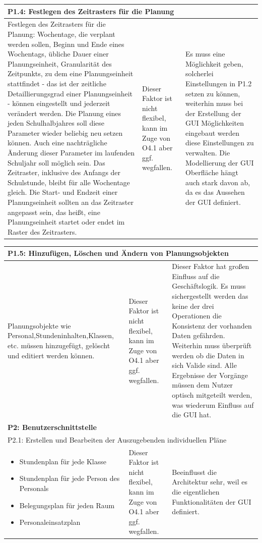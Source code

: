 \documentclass[fontsize=12pt,paper=a4,twoside]{scrartcl}
\begin{document}
\begin{tabularx}{\textwidth}{|X|X|X|}
\hline
\multicolumn{3}{|l|}{P1.4: Festlegen des Zeitrasters für die Planung}\\\hline
Festlegen des Zeitrasters für die Planung: Wochentage, die verplant werden sollen, Beginn und Ende eines Wochentags, übliche Dauer einer Planungseinheit, Granularität des Zeitpunkts, zu dem eine Planungseinheit stattfindet - das ist der zeitliche Detaillierungsgrad einer Planungseinheit - können eingestellt und jederzeit verändert werden. Die Planung eines jeden Schulhalbjahres soll diese Parameter wieder beliebig neu setzen können. Auch eine nachträgliche Änderung dieser Parameter im laufenden Schuljahr soll möglich sein. Das Zeitraster, inklusive des Anfangs der Schulstunde, bleibt für alle Wochentage gleich. Die Start- und Endzeit einer Planungseinheit sollten an das Zeitraster angepasst sein, das heißt, eine Planungseinheit startet oder endet im Raster des Zeitrasters. & Dieser Faktor ist nicht flexibel, kann im Zuge von O4.1 aber ggf. wegfallen. & Es muss eine Möglichkeit geben, solcherlei Einstellungen in P1.2 setzen zu können, weiterhin muss bei der Erstellung der GUI Möglichkeiten eingebaut werden diese Einstellungen zu verwalten. Die Modellierung der GUI Oberfläche hängt auch stark davon ab, da es das Aussehen der GUI definiert. \\\hline
\end{tabularx} \newpage

\begin{tabularx}{\textwidth}{|X|X|X|}
\hline
\multicolumn{3}{|l|}{P1.5: Hinzufügen, Löschen und Ändern von Planungsobjekten}\\\hline
Planungsobjekte wie Personal,Stundeninhalten,Klassen, etc. müssen hinzugefügt, gelöscht und editiert werden können.& Dieser Faktor ist nicht flexibel, kann im Zuge von O4.1 aber ggf. wegfallen. & Dieser Faktor hat großen Einfluss auf die Geschäftslogik. Es muss sichergestellt werden das keine der drei Operationen die Konsistenz der vorhanden Daten gefährden. Weiterhin muss überprüft werden ob die Daten in sich Valide sind. Alle Ergebnisse der Vorgänge müssen dem Nutzer optisch mitgeteilt werden, was wiederum Einfluss auf die GUI hat. \\\hline
\multicolumn{3}{|l|}{\textbf{P2: Benutzerschnittstelle}}\\\hline
\multicolumn{3}{|l|}{P2.1: Erstellen und Bearbeiten der Auszugebenden individuellen Pläne}\\\hline
\begin{itemize}
\item Stundenplan für jede Klasse
\item Stundenplan für jede Person des Personals
\item Belegungsplan für jeden Raum
\item Personaleinsatzplan 
\end{itemize} & Dieser Faktor ist nicht flexibel, kann im Zuge von O4.1 aber ggf. wegfallen. & Beeinflusst die Architektur sehr, weil es die eigentlichen Funktionalitäten der GUI definiert.
\\\hline
\end{tabularx}\\
\end{document}
